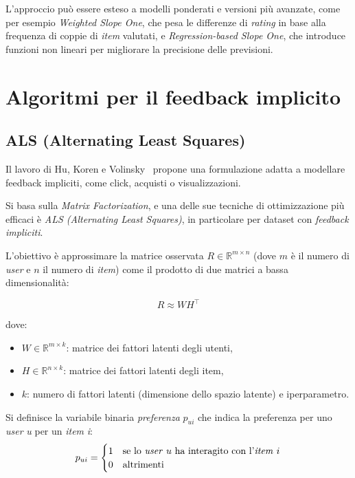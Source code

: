 L'approccio può essere esteso a modelli ponderati e versioni più avanzate, come per esempio \textit{Weighted Slope One}, che pesa le differenze di \textit{rating} in base alla frequenza di coppie di \textit{item} valutati, e \textit{Regression-based Slope One}, che introduce funzioni non lineari per migliorare la precisione delle previsioni.

\section{Algoritmi per il feedback implicito}

\subsection{ALS (Alternating Least Squares)}\label{als}

Il lavoro di Hu, Koren e Volinsky~\cite{ALS} propone una formulazione adatta a modellare feedback impliciti, come click, acquisti o visualizzazioni.

Si basa sulla \textit{Matrix Factorization}, e una delle sue tecniche di ottimizzazione più efficaci è \textit{ALS (Alternating Least Squares)}, in particolare per dataset con \textit{feedback impliciti}.

L'obiettivo è approssimare la matrice osservata $R \in \mathbb{R}^{m \times n}$ (dove $m$ è il numero di \textit{user} e $n$ il numero di \textit{item}) come il prodotto di due matrici a bassa dimensionalità:

\[
R \approx W H^\top
\]

dove:

\begin{itemize}
    \item $W \in \mathbb{R}^{m \times k}$: matrice dei fattori latenti degli utenti,
    \item $H \in \mathbb{R}^{n \times k}$: matrice dei fattori latenti degli item,
    \item $k$: numero di fattori latenti (dimensione dello spazio latente) e iperparametro.
\end{itemize}

Si definisce la variabile binaria \textit{preferenza} $p_{ui}$ che indica la preferenza per uno \textit{user} \textit{u} per un \textit{item} \textit{i}:
\[
p_{ui} =
\begin{cases}
    1 & \text{se lo \textit{user} } u \text{ ha interagito con l'\textit{item} } i \\
    0 & \text{altrimenti}
\end{cases}
\]

